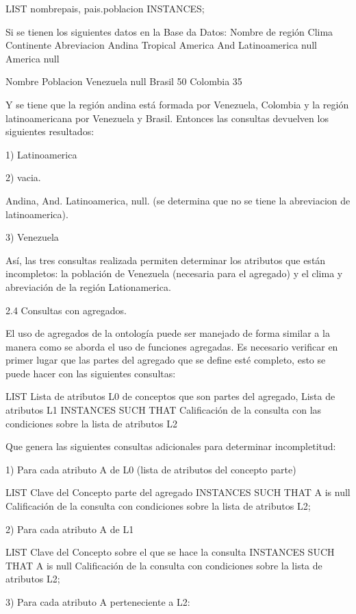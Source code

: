 LIST nombrepais, pais.poblacion INSTANCES;

	Si se tienen los siguientes datos en la Base da Datos:
Nombre de región
Clima
Continente
Abreviacion
Andina
Tropical
America
And
Latinoamerica
null
America
null


Nombre
Poblacion
Venezuela
null
Brasil
50
Colombia
35





Y se tiene que la región andina está formada por Venezuela, Colombia y la región latinoamericana por Venezuela y Brasil. Entonces las consultas devuelven los siguientes resultados:

1)  Latinoamerica

2) vacia.

Andina, And.
Latinoamerica, null. (se determina que no se tiene la abreviacion de latinoamerica).

3) Venezuela

Así, las tres consultas realizada permiten determinar los atributos que están incompletos: la población de Venezuela (necesaria para el agregado) y el clima y abreviación de la región Lationamerica.

2.4 Consultas con agregados.

	El uso de agregados de la ontología puede ser manejado de forma similar a la manera como se aborda el uso de funciones agregadas. Es necesario verificar en primer lugar que las partes del agregado que se define esté completo, esto se puede hacer con las siguientes consultas:

LIST Lista de atributos L0 de conceptos que son partes del agregado, Lista de atributos L1 INSTANCES
SUCH THAT  Calificación de la consulta con las condiciones sobre la lista de atributos L2

	Que genera las siguientes consultas adicionales para determinar incompletitud:

1) Para cada atributo A de L0 (lista de atributos del concepto parte)

LIST Clave del Concepto parte del agregado INSTANCES
SUCH THAT  A is null  Calificación de la consulta con condiciones sobre la lista de atributos L2;

2) Para cada atributo A de L1

LIST Clave del Concepto sobre el que se hace la consulta INSTANCES
SUCH THAT A is null  Calificación de la consulta con condiciones sobre la lista de atributos L2;

3)  Para cada atributo A perteneciente a L2:

